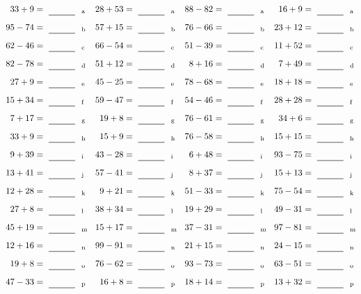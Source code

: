 \documentclass
[
  draft    = true,
  fontsize = 11pt,
  parskip  = half-
]
{scrartcl}
\begin{document}
\clearpage
\begin{align*}
    \pline{33+9}&=\rline{a}
  & \pline{28+53}&=\rline{a}
  & \pline{88-82}&=\rline{a}
  & \pline{16+9}&=\rline{a} \\[1ex]
    \pline{95-74}&=\rline{b}
  & \pline{57+15}&=\rline{b}
  & \pline{76-66}&=\rline{b}
  & \pline{23+12}&=\rline{b} \\[1ex]
    \pline{62-46}&=\rline{c}
  & \pline{66-54}&=\rline{c}
  & \pline{51-39}&=\rline{c}
  & \pline{11+52}&=\rline{c} \\[1ex]
    \pline{82-78}&=\rline{d}
  & \pline{51+12}&=\rline{d}
  & \pline{8+16}&=\rline{d}
  & \pline{7+49}&=\rline{d} \\[1ex]
    \pline{27+9}&=\rline{e}
  & \pline{45-25}&=\rline{e}
  & \pline{78-68}&=\rline{e}
  & \pline{18+18}&=\rline{e} \\[1ex]
    \pline{15+34}&=\rline{f}
  & \pline{59-47}&=\rline{f}
  & \pline{54-46}&=\rline{f}
  & \pline{28+28}&=\rline{f} \\[1ex]
    \pline{7+17}&=\rline{g}
  & \pline{19+8}&=\rline{g}
  & \pline{76-61}&=\rline{g}
  & \pline{34+6}&=\rline{g} \\[1ex]
    \pline{33+9}&=\rline{h}
  & \pline{15+9}&=\rline{h}
  & \pline{76-58}&=\rline{h}
  & \pline{15+15}&=\rline{h} \\[1ex]
    \pline{9+39}&=\rline{i}
  & \pline{43-28}&=\rline{i}
  & \pline{6+48}&=\rline{i}
  & \pline{93-75}&=\rline{i} \\[1ex]
    \pline{13+41}&=\rline{j}
  & \pline{57-41}&=\rline{j}
  & \pline{8+37}&=\rline{j}
  & \pline{15+13}&=\rline{j} \\[1ex]
    \pline{12+28}&=\rline{k}
  & \pline{9+21}&=\rline{k}
  & \pline{51-33}&=\rline{k}
  & \pline{75-54}&=\rline{k} \\[1ex]
    \pline{27+8}&=\rline{l}
  & \pline{38+34}&=\rline{l}
  & \pline{19+29}&=\rline{l}
  & \pline{49-31}&=\rline{l} \\[1ex]
    \pline{45+19}&=\rline{m}
  & \pline{15+17}&=\rline{m}
  & \pline{37-31}&=\rline{m}
  & \pline{97-81}&=\rline{m} \\[1ex]
    \pline{12+16}&=\rline{n}
  & \pline{99-91}&=\rline{n}
  & \pline{21+15}&=\rline{n}
  & \pline{24-15}&=\rline{n} \\[1ex]
    \pline{19+8}&=\rline{o}
  & \pline{76-62}&=\rline{o}
  & \pline{93-73}&=\rline{o}
  & \pline{63-51}&=\rline{o} \\[1ex]
    \pline{47-33}&=\rline{p}
  & \pline{16+8}&=\rline{p}
  & \pline{18+14}&=\rline{p}
  & \pline{13+32}&=\rline{p}
\end{align*}
\end{document}
